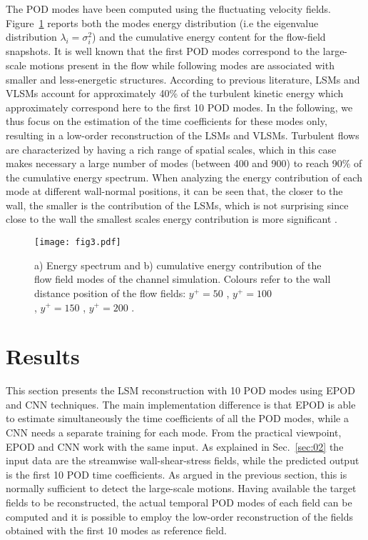The POD modes have been computed using the fluctuating velocity fields.
Figure~\ref{fig:sigma} reports both the modes energy distribution (i.e the eigenvalue distribution $\lambda_i=\sigma_i^2$) and the cumulative energy content for the flow-field snapshots.
It is well known that the first POD modes correspond to the large-scale motions present in the flow \citep{liu2001large,wu2014study} while following modes \textcolor{black}{are} associated with smaller and less-energetic structures.
According to previous literature, LSMs and VLSMs account for approximately 40\% of the turbulent kinetic energy \citep{discetti2019characterization,guala2006large,vila2017adverse} which approximately correspond here to the first 10 POD modes.
In the following, we thus focus on the estimation of the time coefficients for these modes only, resulting in a low-order reconstruction of the LSMs and VLSMs.
Turbulent flows are characterized by having a rich range of spatial scales, which in this case makes necessary a large number of modes (between 400 and 900) to reach 90\% of the cumulative energy spectrum.
When analyzing the energy contribution of each mode at different wall-normal positions, it can be seen that, the closer to the wall, the smaller is the contribution of the LSMs, which is not surprising since close to the wall the smallest scales energy contribution is more significant \citep{ganapathisubramani2012amplitude}.

\begin{figure}
\texttt{[image: fig3.pdf]}%
\caption{\label{fig:sigma}a) Energy spectrum and b) cumulative energy contribution of the flow field modes of the channel simulation. Colours refer to the wall distance position of the flow fields: $y^+=50$ , $y^+=100$ \\, $y^+=150$ , $y^+=200$ .}
\end{figure}

\section{\label{sec:03}Results}

This section presents the LSM reconstruction with 10 POD modes using EPOD and CNN techniques.
The main implementation difference is that EPOD is able to estimate simultaneously the time coefficients of all the POD modes, while a CNN needs a separate training for each mode.
From the practical viewpoint, EPOD and CNN work with the same input. As explained in Sec.~\ref{sec:02} the input data are the streamwise wall-shear-stress fields, while the predicted output is the first 10 POD time coefficients.
As argued in the previous section, this is normally sufficient to detect the large-scale motions.
Having available the target fields to be reconstructed, the actual temporal POD modes of each field can be computed and it is possible to employ the low-order reconstruction of the fields obtained with the first 10 modes as reference field.

